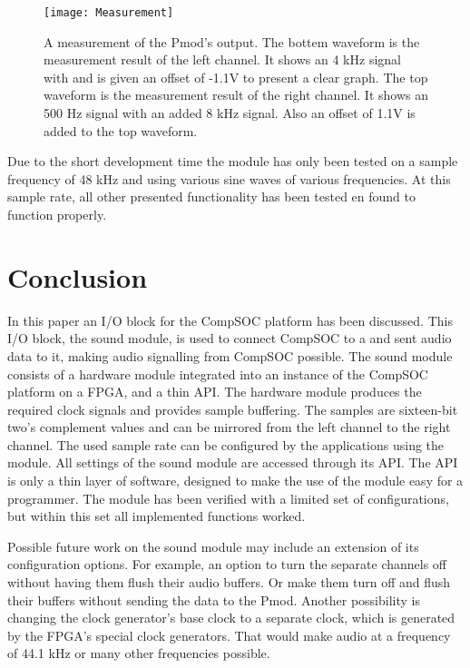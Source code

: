 \begin{figure}[h]
 \texttt{[image: Measurement]}
 \caption{A measurement of the Pmod's output. The bottem waveform is the measurement result of the left channel. It shows an 4  kHz signal with and is given an offset of -1.1V to present a clear graph. The top waveform is the measurement result of the right channel. It shows an 500 Hz signal with an added 8 kHz signal. Also an offset of 1.1V is added to the top waveform.}
 \label{img:meas}
\end{figure}

Due to the short development time the module has only been tested on a sample frequency of 48 kHz and using various sine waves of various frequencies. At this sample rate, all other presented functionality has been tested en found to function properly. 

\section{Conclusion}\label{sec:conc}
In this paper an I/O block for the CompSOC platform has been discussed. This I/O block, the sound module, is used to connect CompSOC to a \digipmod and sent audio data to it, making audio signalling from CompSOC possible. The sound module consists of a hardware module integrated into an instance of the CompSOC platform on a FPGA, and a thin API. The hardware module produces the required clock signals and provides sample buffering. The samples are sixteen-bit two's complement values and can be mirrored from the left channel to the right channel. The used sample rate can be configured by the applications using the module. All settings of the sound module are accessed through its API. The API is only a thin layer of software, designed to make the use of the module easy for a programmer. The module has been verified with a limited set of configurations, but within this set all implemented functions worked.

Possible future work on the sound module may include an extension of its configuration options. For example, an option to turn the separate channels off without having them flush their audio buffers. Or make them turn off and flush their buffers without sending the data to the Pmod. Another possibility is changing the clock generator's base clock to a separate clock, which is generated by the FPGA's special clock generators. That would make audio at a frequency of 44.1 kHz or many other frequencies possible. 


